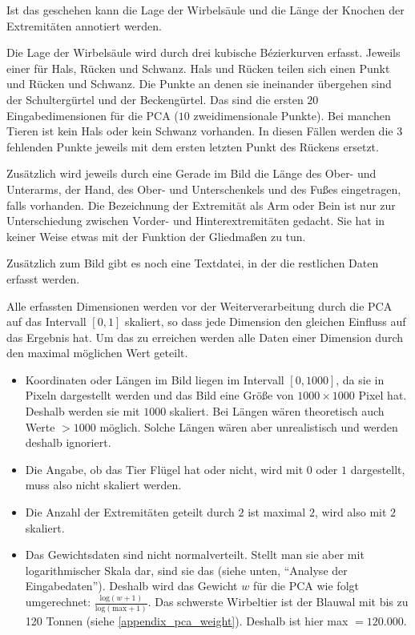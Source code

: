  Ist das geschehen kann die Lage der Wirbelsäule und die Länge der Knochen der Extremitäten annotiert werden.
 
 Die Lage der Wirbelsäule wird durch drei kubische Bézierkurven erfasst. Jeweils einer für Hals, Rücken und Schwanz. Hals und Rücken teilen sich einen Punkt und Rücken und Schwanz. Die Punkte an denen sie ineinander übergehen sind der Schultergürtel und der Beckengürtel.
 Das sind die ersten $20$ Eingabedimensionen für die PCA ($10$ zweidimensionale Punkte). Bei manchen Tieren ist kein Hals oder kein Schwanz vorhanden. In diesen Fällen werden die $3$ fehlenden Punkte jeweils mit dem ersten \bzw letzten Punkt des Rückens ersetzt.
 
 Zusätzlich wird jeweils durch eine Gerade im Bild die Länge des Ober- und Unterarms, der Hand, des Ober- und Unterschenkels und des Fußes eingetragen, falls vorhanden. Die Bezeichnung der Extremität als Arm oder Bein ist nur zur Unterschiedung zwischen Vorder- und Hinterextremitäten gedacht. Sie hat in keiner Weise etwas mit der Funktion der Gliedmaßen zu tun.
 
 Zusätzlich zum Bild gibt es noch eine Textdatei, in der die restlichen Daten erfasst werden.

 Alle erfassten Dimensionen werden vor der Weiterverarbeitung durch die PCA auf das Intervall $[0, 1]$ skaliert, so dass jede Dimension den gleichen Einfluss auf das Ergebnis hat. 
 Um das zu erreichen werden alle Daten einer Dimension durch den maximal möglichen Wert geteilt.
 
 \begin{itemize}
  \item Koordinaten oder Längen im Bild liegen im Intervall $[0, 1000]$, da sie in Pixeln dargestellt werden und das Bild eine Größe von $1000 \times 1000$ Pixel hat. Deshalb werden sie mit $1000$ skaliert. Bei Längen wären theoretisch auch Werte $> 1000$ möglich. Solche Längen wären aber unrealistisch und werden deshalb ignoriert.
  
  \item Die Angabe, ob das Tier Flügel hat oder nicht, wird mit $0$ oder $1$ dargestellt, muss also nicht skaliert werden.
  
  \item Die Anzahl der Extremitäten geteilt durch $2$ ist maximal $2$, wird also mit $2$ skaliert.
  
  \item Das Gewichtsdaten sind nicht normalverteilt. Stellt man sie aber mit logarithmischer Skala dar, sind sie das (siehe unten, "`Analyse der Eingabedaten"'). Deshalb wird das Gewicht $w$ für die PCA wie folgt umgerechnet: $\frac{\mathrm{log}(w+1)}{\mathrm{log}(\mathrm{max}+1)}$. Das schwerste Wirbeltier ist der Blauwal mit bis zu 120 Tonnen (siehe \ref{appendix_pca_weight}). Deshalb ist hier max $= 120.000$.
\end{itemize}

